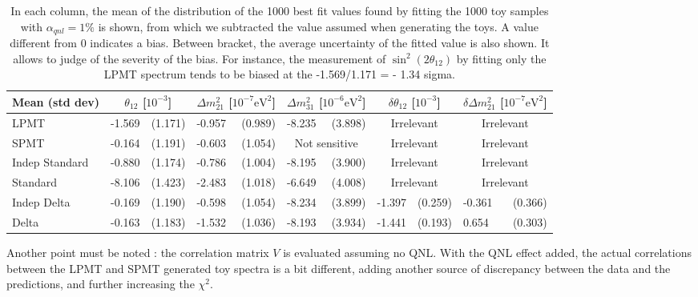 \documentclass[../main.tex]{subfiles}
\begin{document}
\begin{table}[ht]
  \begin{footnotesize}
  \centering
  \begin{tabular}{l|lr|lr|lr|lr|lr|}
    Mean (std dev)  & \multicolumn{2}{c|}{$\theta_{12}$ [$10^{-3}$]} & \multicolumn{2}{c|}{$\Delta m^2_{21}$ [$10^{-7}\mathrm{eV}^{2}$]} & \multicolumn{2}{c|}{$\Delta m^2_{31}$ [$10^{-6}\mathrm{eV}^{2}$]} & \multicolumn{2}{c|}{$\delta \theta_{12}$ [$10^{-3}$]} & \multicolumn{2}{c|}{$\delta \Delta m^2_{21}$ [$10^{-7}\mathrm{eV}^{2}$]} \\
    \hline
    LPMT            & -1.569 & (1.171) & -0.957 & (0.989) & -8.235 & (3.898)       & \multicolumn{2}{c|}{Irrelevant} & \multicolumn{2}{c|}{Irrelevant}  \\
    SPMT            & -0.164 & (1.191) & -0.603 & (1.054) & \multicolumn{2}{c|}{Not sensitive} &\multicolumn{2}{c|}{Irrelevant} & \multicolumn{2}{c|}{Irrelevant}  \\
    Indep Standard  & -0.880 & (1.174) & -0.786 & (1.004) & -8.195 & (3.900)       & \multicolumn{2}{c|}{Irrelevant} & \multicolumn{2}{c|}{Irrelevant}  \\
    Standard        & -8.106 & (1.423) & -2.483 & (1.018) & -6.649 & (4.008)       & \multicolumn{2}{c|}{Irrelevant} & \multicolumn{2}{c|}{Irrelevant}  \\
    Indep Delta     & -0.169 & (1.190) & -0.598 & (1.054) & -8.234 & (3.899)       & -1.397 & (0.259)     & -0.361 & (0.366) \\
    Delta           & -0.163 & (1.183) & -1.532 & (1.036) & -8.193 & (3.934)       & -1.441 & (0.193)     & 0.654  & (0.303) \\
  \end{tabular}
  \end{footnotesize}
  \caption{In each column, the mean of the distribution of the 1000 best fit values found by fitting the 1000 toy samples with $\alpha_{qnl} = 1\%$ is shown, from which we subtracted the value assumed when generating the toys. A value different from 0 indicates a bias. Between bracket, the average uncertainty of the fitted value is also shown. It allows to judge of the severity of the bias. For instance, the measurement of $\sin^2(2 \theta_{12})$ by fitting only the LPMT spectrum tends to be biased at the -1.569/1.171 = - 1.34 sigma. }
  \label{tab:joint_fit:qnl_results}
\end{table}


Another point must be noted : the correlation matrix $V$ is evaluated assuming no QNL. With the QNL effect added, the actual correlations between the LPMT and SPMT generated toy spectra is a bit different, adding another source of discrepancy between the data and the predictions, and further increasing the $\chi^2$.
\end{document}
